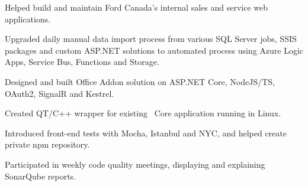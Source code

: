 \documentclass[letterpaper]{cv_12} %
\begin{document}
\begin{minipage}[t]{0.59\textwidth}
    \sectionspace%



    \begin{tightitemize}
        \item Helped build and maintain Ford Canada's internal sales and
        service web applications.
        \item Upgraded daily manual data import process from various SQL Server
        jobs, SSIS packages and custom ASP.NET solutions to automated process using
        Azure Logic Apps, Service Bus, Functions and Storage.
    \end{tightitemize}

    \sectionspace%



    \begin{tightitemize}
        \item Designed and built Office Addon solution on
        ASP.NET Core, NodeJS/TS, OAuth2, SignalR and Kestrel.
        \item Created QT/C++ wrapper for existing \dotnet\ Core application
        running in Linux.
        \item Introduced front-end tests with Mocha, Istanbul and NYC,
        and helped create private npm repository.
        \item Participated in weekly code quality meetings, displaying
        and explaining SonarQube reports.
    \end{tightitemize}

    \sectionspace%




    \sectionspace%



\end{minipage}
\end{document}
